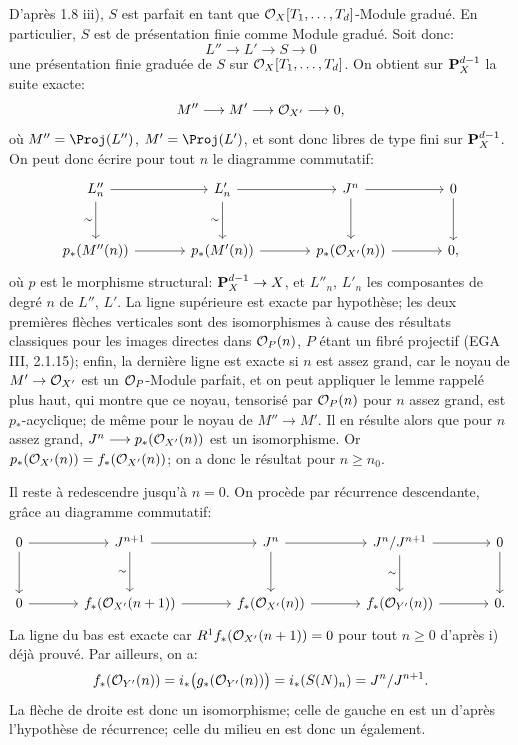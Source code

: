D'après 1.8 iii), \(S\) est parfait en tant que \(\mathcal O_X[T_1,\ldots,T_d]\)-Module gradué. En particulier, \(S\) est de présentation finie comme Module gradué. Soit donc:
\[
L''\longrightarrow L'\longrightarrow S\longrightarrow0
\]
une présentation finie graduée de \(S\) sur \(\mathcal O_X[T_1,\ldots,T_d]\). On obtient sur \(\mathbf P_X^{d-1}\) la suite exacte:
\[
M''\longrightarrow M'\longrightarrow\mathcal O_{X'}\longrightarrow0,
\]
où \(M''=\Proj(L'')\), \(M'=\Proj(L')\), et sont donc libres de type fini sur \(\mathbf P_X^{d-1}\). On peut donc écrire pour tout \(n\) le diagramme commutatif:
\[
\begin{tikzcd}[column sep=large,row sep=large]
L''_n \arrow[r] \arrow[d,"\sim"'] &
L'_n \arrow[r] \arrow[d,"\sim"'] &
J^n \arrow[r] \arrow[d] &
0 \arrow[d]\\
p_*(M''(n)) \arrow[r] &
p_*(M'(n)) \arrow[r] &
p_*(\cO_{X'}(n)) \arrow[r] &
0,
\end{tikzcd}
\]
où \(p\) est le morphisme structural: \(\mathbf P_X^{d-1}\to X\), et \(L''_n\), \(L'_n\) les composantes de degré \(n\) de \(L''\), \(L'\). La ligne supérieure est exacte par hypothèse; les deux premières flèches verticales sont des isomorphismes à cause des résultats classiques pour les images directes dans \(\mathcal O_P(n)\), \(P\) étant un fibré projectif (EGA III, 2.1.15); enfin, la dernière ligne est exacte si \(n\) est assez grand, car le noyau de \(M'\to\mathcal O_{X'}\) est un \(\mathcal O_P\)-Module parfait, et on peut appliquer le lemme rappelé plus haut, qui montre que ce noyau, tensorisé par \(\mathcal O_P(n)\) pour \(n\) assez grand, est \(p_*\)-acyclique; de même pour le noyau de \(M''\to M'\). Il en résulte alors que pour \(n\) assez grand, \(J^n\longrightarrow p_*(\mathcal O_{X'}(n))\) est un isomorphisme. Or \(p_*(\mathcal O_{X'}(n))=f_*(\mathcal O_{X'}(n))\); on a
donc le résultat pour \(n\ge n_0\).

Il reste à redescendre jusqu'à \(n=0\). On procède par récurrence descendante, grâce au diagramme commutatif:
\[
\begin{tikzcd}[column sep=large,row sep=large]
0 \arrow[r] \arrow[d] &
J^{n+1} \arrow[r] \arrow[d,"\sim"'] &
J^n \arrow[r] \arrow[d] &
J^n/J^{n+1} \arrow[r] \arrow[d,"\sim"'] &
0 \arrow[d]\\
0 \arrow[r] &
f_*(\cO_{X'}(n+1)) \arrow[r] &
f_*(\cO_{X'}(n)) \arrow[r] &
f_*(\cO_{Y'}(n)) \arrow[r] &
0.
\end{tikzcd}
\]
La ligne du bas est exacte car \(R^1f_*(\mathcal O_{X'}(n+1))=0\) pour tout \(n\ge0\) d'après i) déjà prouvé. Par ailleurs, on a:
\[
f_*(\mathcal O_{Y'}(n))
=i_*\bigl(g_*(\mathcal O_{Y'}(n))\bigr)
=i_*(S(N)_n)
=J^n/J^{n+1}.
\]
La flèche de droite est donc un isomorphisme; celle de gauche en est un d'après l'hypothèse de récurrence; celle du milieu en est donc un également.

